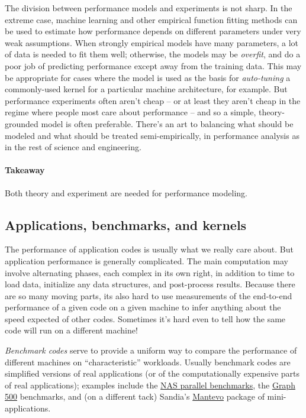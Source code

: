 \documentclass[12pt, leqno]{article} %
\begin{document}
The division between performance models and experiments is not sharp. In
the extreme case, machine learning and other empirical function fitting
methods can be used to estimate how performance depends on different
parameters under very weak assumptions. When strongly empirical models
have many parameters, a lot of data is needed to fit them well;
otherwise, the models may be \emph{overfit}, and do a poor job of
predicting performance except away from the training data. This may be
appropriate for cases where the model is used as the basis for
\emph{auto-tuning} a commonly-used kernel for a particular machine
architecture, for example. But performance experiments often aren't
cheap -- or at least they aren't cheap in the regime where people most
care about performance -- and so a simple, theory-grounded model is
often preferable. There's an art to balancing what should be modeled and
what should be treated semi-empirically, in performance analysis as in
the rest of science and engineering.

\paragraph{Takeaway}

Both theory and experiment are needed for performance modeling.

\subsection{Applications, benchmarks, and kernels}

The performance of application codes is usually what we really care
about. But application performance is generally complicated. The main
computation may involve alternating phases, each complex in its own
right, in addition to time to load data, initialize any data structures,
and post-process results. Because there are so many moving parts, its
also hard to use measurements of the end-to-end performance of a given
code on a given machine to infer anything about the speed expected of
other codes. Sometimes it's hard even to tell how the same code will run
on a different machine!

\emph{Benchmark codes} serve to provide a uniform way to compare the
performance of different machines on ``characteristic'' workloads.
Usually benchmark codes are simplified versions of real applications (or
of the computationally expensive parts of real applications); examples
include the \href{https://www.nas.nasa.gov/publications/npb.html}{NAS
parallel benchmarks}, the \href{http://www.graph500.org/}{Graph 500}
benchmarks, and (on a different tack) Sandia's
\href{https://mantevo.org/}{Mantevo} package of mini-applications.
\end{document}
